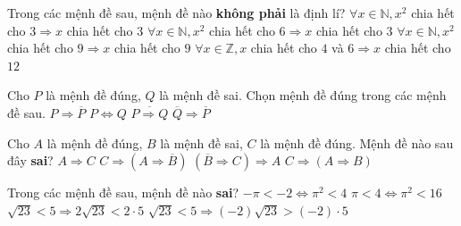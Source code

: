 \begin{ex}%
	Trong các mệnh  đề sau, mệnh đề nào \textbf{không phải} là định lí?
	\choice 
		{$\forall x \in \mathbb{N}, x^2 $ chia hết cho $3 \Rightarrow x$ chia hết cho $3$} 
		{$\forall x \in \mathbb{N}, x^2 $ chia  hết cho $6 \Rightarrow x$ chia hết cho $3$}
		{\True $\forall x \in \mathbb{N}, x^2 $ chia hết cho $ 9\Rightarrow x$ chia hết cho $9$} 
		{$ \forall x \in \mathbb{Z}, x$ chia hết cho $4$ và $6 \Rightarrow x$ chia hết  cho $12$}
\end{ex}

\begin{ex}%
	Cho $P$ là  mệnh đề đúng, $Q$ là mệnh đề sai. Chọn mệnh đề đúng trong các mệnh đề sau.
	 \choice
		 {$P \Rightarrow \overline{P}$}
		 {$P \Leftrightarrow Q$}
		{\True  $\overline{P \Rightarrow Q}$}
		{$\overline{Q} \Rightarrow \overline{P}$} 
\end{ex}

\begin{ex}%
	Cho $A$ là mệnh đề đúng, $B$ là mệnh đề sai, $C$ là  mệnh đề đúng. Mệnh đề nào sau đây {\bf sai}?
	 \choice
		{$A\Rightarrow C$} 
		 {$C\Rightarrow \left(A\Rightarrow\overline{B}\right)$}
		{$\left(\overline{B}\Rightarrow C\right)\Rightarrow  A$}
		{\True $C\Rightarrow (A\Rightarrow B)$} 
\end{ex}

\begin{ex}%
	 Trong các mệnh đề sau, mệnh đề nào \textbf{sai}?
	\choice 
		{\True $  -\pi<-2\Leftrightarrow \pi ^2<4$}
		{$ \pi<4\Leftrightarrow\pi ^2<16$} 
		{$\sqrt{23}<5\Rightarrow 2\sqrt{23}<2\cdot 5  $}
		{$\sqrt{23}<5\Rightarrow (-2)\sqrt{23}>(-2)\cdot 5  $}
\end{ex}

